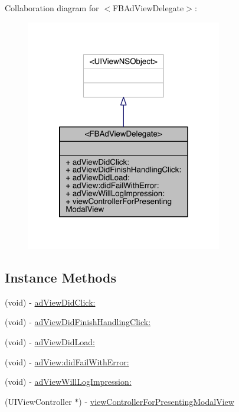 Collaboration diagram for $<$F\-B\-Ad\-View\-Delegate$>$\-:
\nopagebreak
\begin{figure}[H]
\begin{center}
\leavevmode
\includegraphics[width=242pt]{protocol_f_b_ad_view_delegate-p__coll__graph}
\end{center}
\end{figure}
\subsection*{Instance Methods}
\begin{DoxyCompactItemize}
\item 
(void) -\/ \hyperlink{protocol_f_b_ad_view_delegate-p_aeead31f23215c530a65a8021b60be272}{ad\-View\-Did\-Click\-:}
\item 
(void) -\/ \hyperlink{protocol_f_b_ad_view_delegate-p_afb3e3feef789d7d7869646f921d9bdad}{ad\-View\-Did\-Finish\-Handling\-Click\-:}
\item 
(void) -\/ \hyperlink{protocol_f_b_ad_view_delegate-p_a886052c0c3a43d986e216f1fedd6fed4}{ad\-View\-Did\-Load\-:}
\item 
(void) -\/ \hyperlink{protocol_f_b_ad_view_delegate-p_a77cdc0973aacc3ef566ad0fdf09de358}{ad\-View\-:did\-Fail\-With\-Error\-:}
\item 
(void) -\/ \hyperlink{protocol_f_b_ad_view_delegate-p_aa27a11acae34adb3e9f89c066d544f0f}{ad\-View\-Will\-Log\-Impression\-:}
\item 
(U\-I\-View\-Controller $\ast$) -\/ \hyperlink{protocol_f_b_ad_view_delegate-p_af7ccf273bfa446223c58402271e27dda}{view\-Controller\-For\-Presenting\-Modal\-View}
\end{DoxyCompactItemize}


